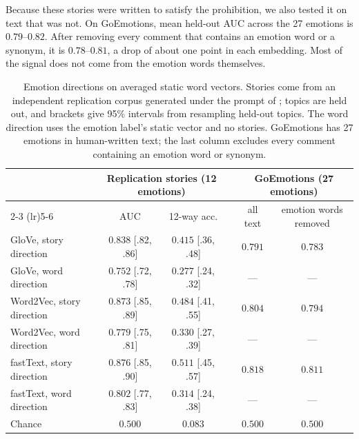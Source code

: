\documentclass[11pt]{article}
\begin{document}
Because these stories were written to satisfy the prohibition, we also tested it on text
that was not. On GoEmotions, mean held-out AUC across the 27 emotions is $0.79$--$0.82$.
After removing every comment that contains an emotion word or a synonym, it is $0.78$--$0.81$,
a drop of about one point in each embedding. Most of the signal does not come from the
emotion words themselves.

\begin{table}[t]
  \centering
  \caption{Emotion directions on averaged static word vectors. Stories come from an
  independent replication corpus \citep{ogunlana2026qwenemotion} generated under the prompt
  of \citet{sofroniew2026emotion}; topics are held out, and brackets give 95\% intervals from
  resampling held-out topics. The word direction uses the emotion label's static vector and no
  stories. GoEmotions \citep{demszky2020goemotions} has 27 emotions in human-written text; the
  last column excludes every comment containing an emotion word or synonym.}
  \label{tab:emotion}
  \small
  \begin{tabular}{lccccc}
    \toprule
    & \multicolumn{2}{c}{Replication stories (12 emotions)} & & \multicolumn{2}{c}{GoEmotions (27 emotions)} \\
    \cmidrule(lr){2-3} \cmidrule(lr){5-6}
    & AUC & 12-way acc. & & all text & emotion words removed \\
    \midrule
    GloVe, story direction    & $0.838$ {\scriptsize [.82, .86]} & $0.415$ {\scriptsize [.36, .48]} & & $0.791$ & $0.783$ \\
    GloVe, word direction     & $0.752$ {\scriptsize [.72, .78]} & $0.277$ {\scriptsize [.24, .32]} & & --- & --- \\
    Word2Vec, story direction & $0.873$ {\scriptsize [.85, .89]} & $0.484$ {\scriptsize [.41, .55]} & & $0.804$ & $0.794$ \\
    Word2Vec, word direction  & $0.779$ {\scriptsize [.75, .81]} & $0.330$ {\scriptsize [.27, .39]} & & --- & --- \\
    fastText, story direction & $0.876$ {\scriptsize [.85, .90]} & $0.511$ {\scriptsize [.45, .57]} & & $0.818$ & $0.811$ \\
    fastText, word direction  & $0.802$ {\scriptsize [.77, .83]} & $0.314$ {\scriptsize [.24, .38]} & & --- & --- \\
    \midrule
    Chance                    & $0.500$ & $0.083$ & & $0.500$ & $0.500$ \\
       \bottomrule
  \end{tabular}
\end{table}
\end{document}
